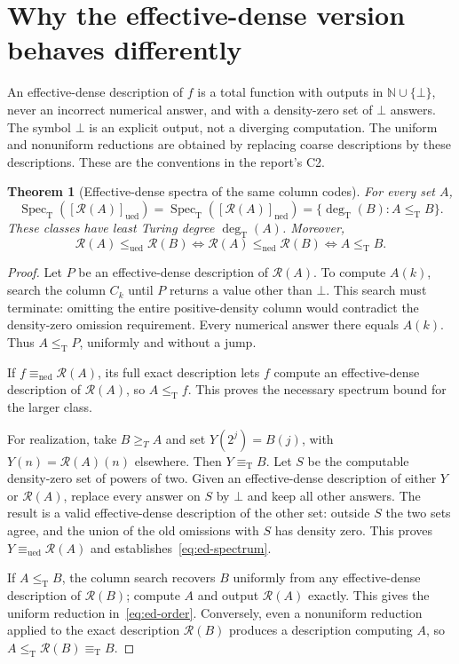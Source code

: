 \documentclass[11pt,a4paper]{article}
\newcommand{\N}{\mathbb N}
\newcommand{\leT}{\leq_{\mathrm T}}
\newcommand{\eqT}{\equiv_{\mathrm T}}
\newcommand{\leued}{\leq_{\mathrm{ued}}}
\newcommand{\lened}{\leq_{\mathrm{ned}}}
\newcommand{\equed}{\equiv_{\mathrm{ued}}}
\newcommand{\eqned}{\equiv_{\mathrm{ned}}}
\newcommand{\Spec}{\operatorname{Spec}_{\mathrm T}}
\newcommand{\degT}{\operatorname{deg}_{\mathrm T}}
\newcommand{\R}{\mathcal R}
\newtheorem{theorem}{Theorem}[section]
\theoremstyle{definition}\newtheorem{definition}[theorem]{Definition}
\theoremstyle{remark}\newtheorem{remark}[theorem]{Remark}
\begin{document}
\section{Why the effective-dense version behaves differently}
\label{sec:ed}
An effective-dense description of $f$ is a total function with outputs in $\N\cup\{\bot\}$, never an incorrect numerical answer, and with a density-zero set of $\bot$ answers. The symbol $\bot$ is an explicit output, not a diverging computation. The uniform and nonuniform reductions are obtained by replacing coarse descriptions by these descriptions. These are the conventions in the report's C2.

\begin{theorem}[Effective-dense spectra of the same column codes]\label{thm:ed}
For every set $A$,
\begin{equation}
 \Spec([\R(A)]_{\mathrm{ued}})
 =\Spec([\R(A)]_{\mathrm{ned}})
 =\{\degT(B):A\leT B\}.
 \label{eq:ed-spectrum}
\end{equation}
These classes have least Turing degree $\degT(A)$. Moreover,
\begin{equation}
 \R(A)\leued\R(B)
 \Longleftrightarrow\R(A)\lened\R(B)
 \Longleftrightarrow A\leT B.
 \label{eq:ed-order}
\end{equation}
\end{theorem}
\begin{proof}
Let $P$ be an effective-dense description of $\R(A)$. To compute $A(k)$, search the column $C_k$ until $P$ returns a value other than $\bot$. This search must terminate: omitting the entire positive-density column would contradict the density-zero omission requirement. Every numerical answer there equals $A(k)$. Thus $A\leT P$, uniformly and without a jump.

If $f\eqned\R(A)$, its full exact description lets $f$ compute an effective-dense description of $\R(A)$, so $A\leT f$. This proves the necessary spectrum bound for the larger class.

For realization, take $B\geq_T A$ and set $Y(2^j)=B(j)$, with $Y(n)=\R(A)(n)$ elsewhere. Then $Y\eqT B$. Let $S$ be the computable density-zero set of powers of two. Given an effective-dense description of either $Y$ or $\R(A)$, replace every answer on $S$ by $\bot$ and keep all other answers. The result is a valid effective-dense description of the other set: outside $S$ the two sets agree, and the union of the old omissions with $S$ has density zero. This proves $Y\equed\R(A)$ and establishes~\eqref{eq:ed-spectrum}.

If $A\leT B$, the column search recovers $B$ uniformly from any effective-dense description of $\R(B)$; compute $A$ and output $\R(A)$ exactly. This gives the uniform reduction in~\eqref{eq:ed-order}. Conversely, even a nonuniform reduction applied to the exact description $\R(B)$ produces a description computing $A$, so $A\leT\R(B)\eqT B$.
\end{proof}
\end{document}
